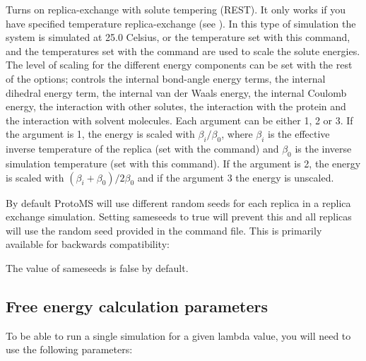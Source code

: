 \documentclass[letterpaper,10pt,english]{sphinxmanual}
\begin{document}
Turns on replica-exchange with solute tempering (REST). It only works if you have specified temperature replica-exchange (see {\hyperref[\detokenize{protoms:temperature-replica-exchange-parameters}]{}}). In this type of simulation the system is simulated at 25.0 Celsius, or the temperature set with this command, and the temperatures set with the  command are used to scale the solute energies. The level of scaling for the different energy components can be set with the rest of the options;  controls the internal bond-angle energy terms,  the internal dihedral energy term,  the internal van der Waals energy,  the internal Coulomb energy,  the interaction with other solutes,  the interaction with the protein and  the interaction with solvent molecules. Each argument can be either 1, 2 or 3. If the argument is 1, the energy is scaled with \(\beta_i/\beta_0\), where \(\beta_i\) is the effective inverse temperature of the replica (set with the  command) and \(\beta_0\) is the inverse simulation temperature (set with this command). If the argument is 2, the energy is scaled with \((\beta_i+\beta_0)/2\beta_0\) and if the argument 3 the energy is unscaled.

\ignorespaces 
By default ProtoMS will use different random seeds for each replica in a replica exchange simulation. Setting sameseeds to true will prevent this and all replicas will use the random seed provided in the command file. This is primarily available for backwards compatibility:

%
\begin{sphinxVerbatim}[commandchars=\\\{\}]
 
\end{sphinxVerbatim}

The value of sameseeds is false by default.


\subsection{Free energy calculation parameters}
\label{\detokenize{protoms:free-energy-calculation-parameters}}
To be able to run a single simulation for a given lambda value, you will need to use the following parameters:
\end{document}
